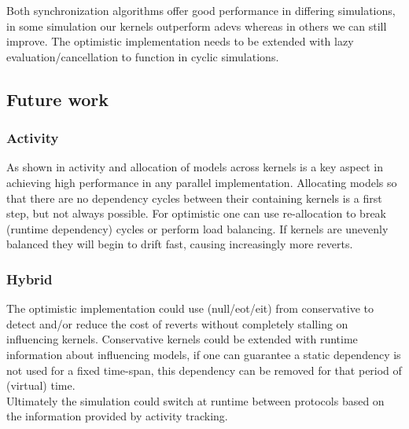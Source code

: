 Both synchronization algorithms offer good performance in differing simulations, in some simulation our kernels outperform adevs whereas in others we can still improve. 
The optimistic implementation needs to be extended with lazy evaluation/cancellation to function in cyclic simulations.
\subsection{Future work}
\subsubsection{Activity}
As shown in \cite{PythonPDEVS_ACTIMS} activity and allocation of models across kernels is a key aspect in achieving high performance in any parallel implementation. Allocating models so that there are no dependency cycles between their containing kernels is a first step, but not always possible. For optimistic one can use re-allocation to break (runtime dependency) cycles or perform load balancing. If kernels are unevenly balanced they will begin to drift fast, causing increasingly more reverts. 
\subsubsection{Hybrid}
The optimistic implementation could use (null/eot/eit) from conservative to detect and/or reduce the cost of reverts without completely stalling on influencing kernels.
Conservative kernels could be extended with runtime information about influencing models, if one can guarantee a static dependency is not used for a fixed time-span, this dependency can be removed for that period of (virtual) time. \\
Ultimately the simulation could switch at runtime between protocols based on the information provided by activity tracking.
